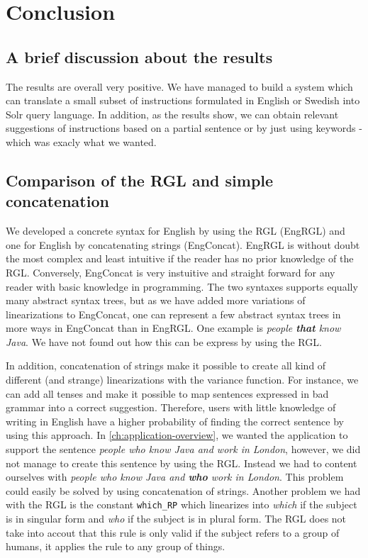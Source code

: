 \chapter{Conclusion}\label{ch:conclusion}
\section{A brief discussion about the results}
The results are overall very positive. We have managed to build a system which can translate a small subset of instructions formulated in English or Swedish into Solr query language. In addition, as the results show, we can obtain relevant suggestions of instructions based on a partial sentence or by just using keywords - which was exacly what we wanted.


\section{Comparison of the RGL and simple concatenation}\label{sec:comparison}
We developed a concrete syntax for English by using the RGL (EngRGL) and one for English by concatenating strings (EngConcat). EngRGL is without doubt the most complex and least intuitive if the reader has no prior knowledge of the RGL. Conversely, EngConcat is very instuitive and straight forward for any reader with basic knowledge in programming. The two syntaxes supports equally many abstract syntax trees, but as we have added more variations of linearizations to EngConcat, one can represent a few abstract syntax trees in more ways in EngConcat than in EngRGL. One example is \emph{people \textbf{that} know Java}. We have not found out how this can be express by using the RGL.

In addition, concatenation of strings make it possible to create all kind of different (and strange) linearizations with the variance function. For instance, we can add all tenses and make it possible to map sentences expressed in bad grammar into a correct suggestion. Therefore, users with little knowledge of writing in English have a higher probability of finding the correct sentence by using this approach.
\newline
\newline
In \autoref{ch:application-overview}, we wanted the application to support the sentence \emph{people who know Java and work in London}, however, we did not manage to create this sentence by using the RGL. Instead we had to content ourselves with \emph{people who know Java and \textbf{who} work in London}. This problem could easily be solved by using concatenation of strings.
\newline
\newline
Another problem we had with the RGL is the constant \texttt{which\_RP} which linearizes into \emph{which} if the subject is in singular form and \emph{who} if the subject is in plural form. The RGL does not take into accout that this rule is only valid if the subject refers to a group of humans, it applies the rule to any group of things.

